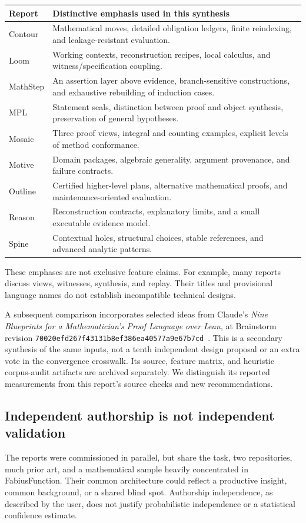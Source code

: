 \documentclass[11pt,letterpaper]{article}
\newcommand{\code}[1]{\nolinkurl{#1}}
\begin{document}
\begin{tabularx}{\textwidth}{@{}lY@{}}
\toprule
Report & Distinctive emphasis used in this synthesis \\
\midrule
Contour & Mathematical moves, detailed obligation ledgers, finite reindexing, and leakage-resistant evaluation.\\
Loom & Working contexts, reconstruction recipes, local calculus, and witness/specification coupling.\\
MathStep & An assertion layer above evidence, branch-sensitive constructions, and exhaustive rebuilding of induction cases.\\
MPL & Statement seals, distinction between proof and object synthesis, preservation of general hypotheses.\\
Mosaic & Three proof views, integral and counting examples, explicit levels of method conformance.\\
Motive & Domain packages, algebraic generality, argument provenance, and failure contracts.\\
Outline & Certified higher-level plans, alternative mathematical proofs, and maintenance-oriented evaluation.\\
Reason & Reconstruction contracts, explanatory limits, and a small executable evidence model.\\
Spine & Contextual holes, structural choices, stable references, and advanced analytic patterns.\\
\bottomrule
\end{tabularx}

These emphases are not exclusive feature claims. For example, many reports discuss
views, witnesses, synthesis, and replay. Their titles and provisional language names
do not establish incompatible technical designs.

A subsequent comparison incorporates selected ideas from Claude's
\emph{Nine Blueprints for a Mathematician's Proof Language over Lean}, at Brainstorm
revision \code{70020efd267f43131b8ef386ea40577a9e67b7cd}~\cite{secondary}.
This is a secondary synthesis of the same inputs, not a tenth independent design
proposal or an extra vote in the convergence crosswalk. Its source, feature matrix,
and heuristic corpus-audit artifacts are archived separately. We distinguish its
reported measurements from this report's source checks and new recommendations.

\subsection{Independent authorship is not independent validation}
The reports were commissioned in parallel, but share the task, two repositories,
much prior art, and a mathematical sample heavily concentrated in FabiusFunction.
Their common architecture could reflect a productive insight, common background,
or a shared blind spot. Authorship independence, as described by the user, does
not justify probabilistic independence or a statistical confidence estimate.
\end{document}
